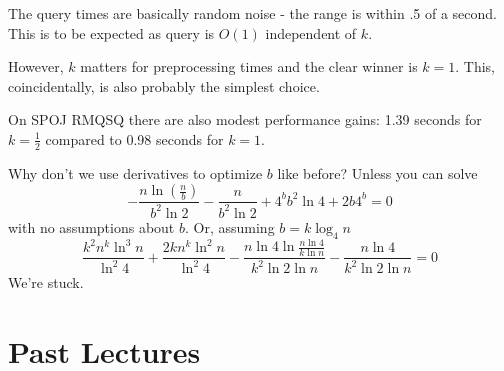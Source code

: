 \documentclass[11pt, oneside]{article}
\begin{document}
The query times are basically random noise - the range is within .5 of a second.
This is to be expected as query is \( O(1) \) independent of \( k \).

However, \( k \) matters for preprocessing times and the clear winner is \( k = 1 \).
This, coincidentally, is also probably the simplest choice.

On SPOJ RMQSQ there are also modest performance gains: 1.39 seconds for \( k = \frac{1}{2} \)
compared to 0.98 seconds for \( k = 1 \).

Why don't we use derivatives to optimize \( b \) like before?
Unless you can solve
\[ -\frac{n \ln(\frac{n}{b})}{b^2 \ln 2} - \frac{n}{b^2 \ln 2} +
4^b b^2 \ln 4 + 2b 4^b = 0 \]
with no assumptions about \( b \).
Or, assuming \( b = k \log_4 n \)
\[ \frac{k^2 n^k \ln^3 n}{\ln^2 4} + \frac{2k n^k \ln^2 n}{\ln^2 4}
- \frac{n \ln 4 \ln{\frac{n \ln 4}{k \ln n}}}{k^2 \ln 2 \ln n}
- \frac{n \ln 4}{k^2 \ln 2 \ln n} = 0 \]
We're stuck.

\newpage

\section{Past Lectures}
\end{document}
